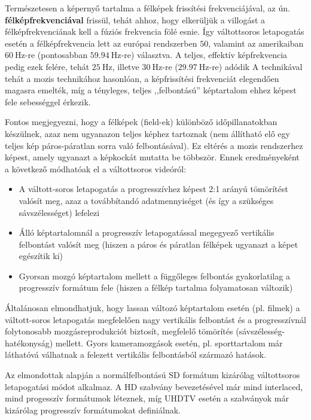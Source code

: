 Természetesen a képernyő tartalma a félképek frissítési frekvenciájával, az ún. \textbf{félképfrekvenciával} frissül, tehát ahhoz, hogy elkerüljük a villogást a félképfrekvenciának kell a fúziós frekvencia fölé esnie. 
Így váltottsoros letapogatás esetén a félképfrekvencia lett az európai rendszerben $50$, valamint az amerikaiban $60~\mathrm{Hz}$-re (pontosabban $59.94~\mathrm{Hz}$-re) választva.
A teljes, effektív képfrekvencia pedig ezek felére, tehát $25~\mathrm{Hz}$, illetve $30~\mathrm{Hz}$-re ($29.97~\mathrm{Hz}$-re) adódik
A technikával tehát a mozis technikához hasonlóan, a képfrissítési frekvenciát elegendően magasra emelték, míg a tényleges, teljes ,,felbontású'' képtartalom ehhez képest fele sebességgel érkezik.

Fontos megjegyezni, hogy a félképek (field-ek) különböző időpillanatokban készülnek, azaz nem ugyanazon teljes képhez tartoznak (nem állítható elő egy teljes kép páros-páratlan sorra való felbontásával). 
Ez eltérés a mozis rendszerhez képest, amely ugyanazt a képkockát mutatta be többször.
Ennek eredményeként a következő módhatóak el a váltottsoros videóról:
\begin{itemize}
\item A váltott-soros letapogatás a progresszívhez képest 2:1 arányú tömörítést valósít meg, azaz a továbbítandó adatmennyiséget (és így a szükséges sávszélességet) lefelezi
\item Álló képtartalomnál a progresszív letapogatással megegyező vertikális felbontást valósít meg (hiszen a páros és páratlan félképek ugyanazt a képet egészítik ki)
\item Gyorsan mozgó képtartalom mellett a függőleges felbontás gyakorlatilag a progresszív formátum fele (hiszen a félkép tartalma folyamatosan változik)
\end{itemize}
Általánosan elmondhatjuk, hogy lassan változó képtartalom esetén (pl. filmek) a váltott-soros letapogatás megfelelően nagy vertikális felbontást és a progresszívnál folytonosabb mozgásreprodukciót biztosít, megfelelő tömörítés (sávszélesség-hatékonyság) mellett.
Gyors kameramozgások esetén, pl. sporttartalom már láthatóvá válhatnak a felezett vertikális felbontásból származó hatások.
\vspace{3mm}

Az elmondottak alapján a normálfelbontású SD formátum kizárólag váltottsoros letapogatási módot alkalmaz.
A HD szabvány bevezetésével már mind interlaced, mind progesszív formátumok léteznek, míg UHDTV esetén a szabványok már kizárólag progresszív formátumokat definiálnak.

